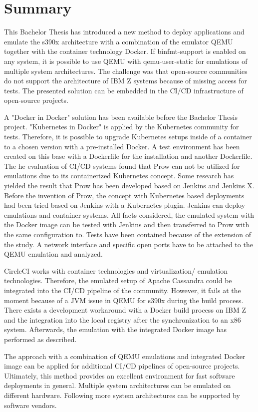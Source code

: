 \chapter{Summary}\label{ch:summary}

This Bachelor Thesis has introduced a new method to deploy applications and emulate the s390x architecture with a combination of the emulator \gls{QEMU} together with the container technology Docker.
If binfmt-support is enabled on any system, it is possible to use \gls{QEMU} with qemu-user-static for emulations of multiple system architectures. 
The challenge was that open-source communities do not support the architecture of IBM Z systems because of missing access for tests. The presented solution can be embedded in the \gls{CI/CD} infrastructure of open-source projects. 

A "Docker in Docker" solution has been available before the Bachelor Thesis project. "Kubernetes in Docker" is applied by the Kubernetes community for tests. 
Therefore, it is possible to upgrade Kubernetes setups inside of a container to a chosen version with a pre-installed Docker. A test environment has been created on this base with a Dockerfile for the installation and another Dockerfile. The he evaluation of \gls{CI/CD} systems found that Prow can not be utilized for emulations due to its containerized Kubernetes concept. 
Some research has yielded the result that Prow has been developed based on Jenkins and Jenkins X. Before the invention of Prow, the concept with Kubernetes based deployments had been  tried based on Jenkins with a Kubernetes plugin. Jenkins can deploy emulations and container systems. 
All facts considered, the emulated system with the Docker image can be tested with Jenkins and then transferred to Prow with the same configuration to.
Tests have been contained because of the extension of the study. A network interface and specific open ports have to be attached to the \gls{QEMU} emulation and analyzed. 

CircleCI works with container technologies and virtualization/ emulation technologies. 
Therefore, the emulated setup of Apache Cassandra could be integrated into the \gls{CI/CD} pipeline of the community. However, it fails at the moment because of a JVM issue in \gls{QEMU} for s390x during the build process. 
There exists a development workaround with a Docker build process on IBM Z and the integration into the local registry after the synchronization to an x86 system. Afterwards, the emulation with the integrated Docker image has performed as described.

The approach with a combination of \gls{QEMU} emulations and integrated Docker image can be applied for additional \gls{CI/CD} pipelines of open-source projects. Ultimately, this method provides an excellent environment for fast software deployments in general. 
Multiple system architectures can be emulated on different hardware. Following more system architectures can be supported by software vendors.